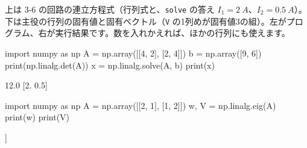 {\small 上は 3-6 の回路の連立方程式（行列式と、\texttt{solve} の答え $I_1=\qty{2}{A}$、$I_2=\qty{0.5}{A}$）。下は主役の行列の固有値と固有ベクトル（\texttt{V} の1列めが固有値3の組）。左がプログラム、右が実行結果です。数を入れかえれば、ほかの行列にも使えます。}\par\vspace{1mm}
\noindent\begin{minipage}[t]{0.42\linewidth}\vspace{0pt}
\begin{bkcode}[Python]
import numpy as np
A = np.array([[4, 2],
              [2, 4]])
b = np.array([9, 6])
print(np.linalg.det(A))
x = np.linalg.solve(A, b)
print(x)
\end{bkcode}
\end{minipage}\hfill
\begin{minipage}[t]{0.55\linewidth}\vspace{0pt}
\begin{bkcodeout}[実行結果]
12.0
[2.  0.5]
\end{bkcodeout}
\end{minipage}\par\vspace{2mm}
\noindent\begin{minipage}[t]{0.42\linewidth}\vspace{0pt}
\begin{bkcode}[Python]
import numpy as np
A = np.array([[2, 1],
              [1, 2]])
w, V = np.linalg.eig(A)
print(w)
print(V)
\end{bkcode}
\end{minipage}\hfill
\begin{minipage}[t]{0.55\linewidth}\vspace{0pt}
\begin{bkcodeout}[実行結果]
[3.+0.j 1.+0.j]
[[ 0.70710678+0.j -0.70710678+0.j]
 [ 0.70710678+0.j  0.70710678+0.j]]
\end{bkcodeout}
\end{minipage}\par\vspace{2mm}

